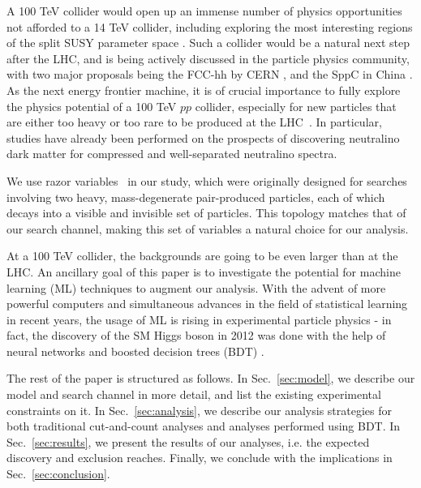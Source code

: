 \documentclass[a4paper,11pt]{article}
\begin{document}
A 100 TeV collider would open up an immense number of physics
opportunities not afforded to a 14 TeV collider, including exploring the
most interesting regions of the split SUSY parameter space
\citep{Arkani-Hamed:2015vfh}.
Such a collider would be a natural next step after the LHC, and is being
actively discussed in the particle physics community, with two major
proposals being the FCC-hh by CERN \citep{FCC-hh}, and the SppC  
in China \citep{CEPC}.  As the next energy frontier machine, it is of 
crucial importance to fully explore the physics potential of a 100 TeV $pp$
collider, especially for new particles that are either too heavy or too rare 
to be produced at the LHC~\citep{Arkani-Hamed:2015vfh,Contino:2016spe,Golling:2016gvc,Mangano:2016jyj}.
In particular, studies have already been performed on the prospects of
discovering neutralino dark matter for compressed \cite{Low:2014cba, diCortona:2014yua,Cirelli:2014dsa,Mahbubani:2018tin,Han:2018wus}
and well-separated \cite{Gori:2014oua,Acharya:2014pua}
neutralino spectra.


We use razor variables~\citep{Rogan:2010kb} in our study, which were originally designed
for searches involving two heavy, mass-degenerate pair-produced
particles, each of which decays into a visible and invisible set of
particles. This topology matches that of our search channel, making this
set of variables a natural choice for our analysis.  

At a 100 TeV collider, the backgrounds are going to be even larger than
at the LHC.  An ancillary goal of this paper is to investigate the
potential for machine learning (ML) techniques to augment our analysis.
With the advent of more powerful computers and simultaneous advances in
the field of statistical learning in recent years, the usage of ML is
rising in experimental particle physics - in fact, the discovery of the
SM Higgs boson in 2012 was done with the help of neural networks
\citep{Aad:2012tfa} and boosted decision trees (BDT)
\citep{Chatrchyan:2012xdj}.

The rest of the paper is structured as follows. In Sec.~\ref{sec:model}, we describe our model and search channel in more
detail, and list the existing experimental constraints on it. In Sec.~\ref{sec:analysis}, we describe our analysis strategies 
for both traditional cut-and-count analyses and analyses
performed using BDT. In Sec.~\ref{sec:results},
we present the results of our analyses, i.e. the expected discovery and exclusion
reaches. Finally, we conclude with the implications in Sec.~\ref{sec:conclusion}.
\end{document}
